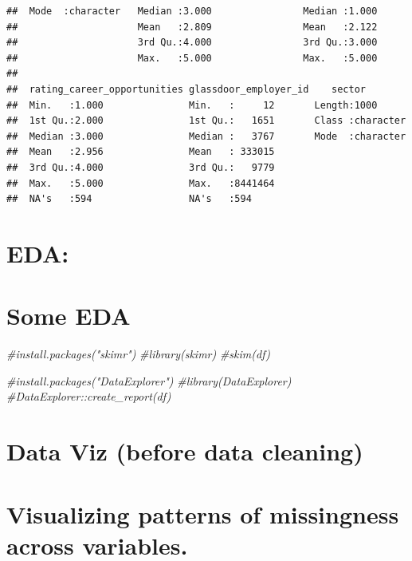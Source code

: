 \documentclass[
]{article}
\newenvironment{Shaded}{\begin{snugshade}}{\end{snugshade}}
\newcommand{\CommentTok}[1]{\textcolor[rgb]{0.56,0.35,0.01}{\textit{#1}}}
\begin{document}
\begin{verbatim}
##  Mode  :character   Median :3.000                Median :1.000           
##                     Mean   :2.809                Mean   :2.122           
##                     3rd Qu.:4.000                3rd Qu.:3.000           
##                     Max.   :5.000                Max.   :5.000           
##                                                                          
##  rating_career_opportunities glassdoor_employer_id    sector         
##  Min.   :1.000               Min.   :     12       Length:1000       
##  1st Qu.:2.000               1st Qu.:   1651       Class :character  
##  Median :3.000               Median :   3767       Mode  :character  
##  Mean   :2.956               Mean   : 333015                         
##  3rd Qu.:4.000               3rd Qu.:   9779                         
##  Max.   :5.000               Max.   :8441464                         
##  NA's   :594                 NA's   :594
\end{verbatim}

\section{EDA:}\label{eda}

\section{Some EDA}\label{some-eda}

\begin{Shaded}
\begin{Highlighting}[]
\CommentTok{\#install.packages("skimr")}
\CommentTok{\#library(skimr)}
\CommentTok{\#skim(df)}
\end{Highlighting}
\end{Shaded}

\begin{Shaded}
\begin{Highlighting}[]
\CommentTok{\#install.packages("DataExplorer")}
\CommentTok{\#library(DataExplorer)}
\CommentTok{\#DataExplorer::create\_report(df)}
\end{Highlighting}
\end{Shaded}

\section{Data Viz (before data
cleaning)}\label{data-viz-before-data-cleaning}

\section{Visualizing patterns of missingness across
variables.}\label{visualizing-patterns-of-missingness-across-variables.}
\end{document}
